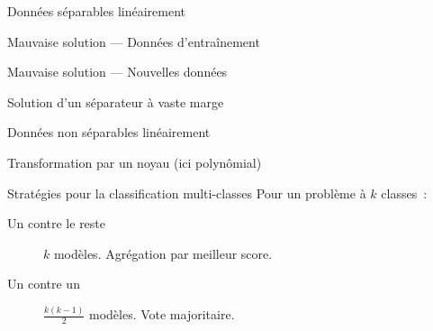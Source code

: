 \begin{frame}{Données séparables linéairement}
\end{frame}

\begin{frame}{Mauvaise solution — Données d'entraînement}
\end{frame}

\begin{frame}{Mauvaise solution — Nouvelles données}
\end{frame}

\begin{frame}{Solution d'un séparateur à vaste marge}
\end{frame}

\begin{frame}{Données non séparables linéairement}
\end{frame}

\begin{frame}{Transformation par un noyau (ici polynômial)}
\end{frame}

\begin{frame}{Stratégies pour la classification multi-classes}
  Pour un problème à $k$ classes~:

  \begin{description}
    \item[Un contre le reste] $k$ modèles. Agrégation par meilleur score.
    \item[Un contre un] $\frac{k(k - 1)}{2}$ modèles. Vote majoritaire.
  \end{description}
\end{frame}
